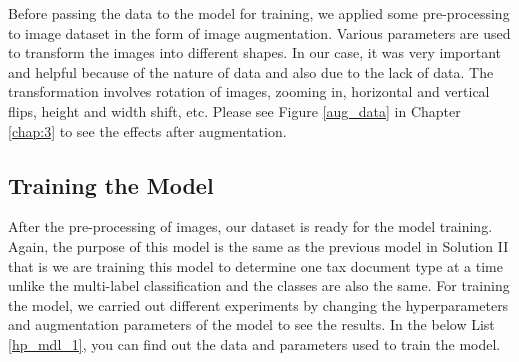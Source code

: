 \newline
\par
Before passing the data to the model for training, we applied some pre-processing to image dataset in the form of image augmentation. Various parameters are used to transform the images into different shapes. In our case, it was very important and helpful because of the nature of data and also due to the lack of data. The transformation involves rotation of images, zooming in, horizontal and vertical flips, height and width shift, etc. Please see Figure \ref{aug_data} in Chapter \ref{chap:3} to see the effects after augmentation.
\subsection{Training the Model}
After the pre-processing of images, our dataset is ready for the model training. Again, the purpose of this model is the same as the previous model in Solution II that is we are training this model to determine one tax document type at a time unlike the multi-label classification and the classes are also the same. For training the model, we carried out different experiments by changing the hyperparameters and augmentation parameters of the model to see the results. In the below List \ref{hp_mdl_1}, you can find out the data and parameters used to train the model.
